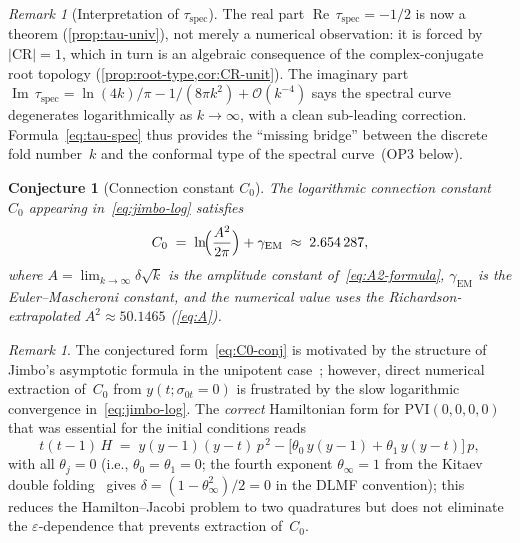 \documentclass[11pt,a4paper]{article}
\theoremstyle{plain}
\newtheorem{conjecture}[theorem]{Conjecture}
\theoremstyle{definition}
\theoremstyle{remark}
\newtheorem{remark}[theorem]{Remark}
\DeclareMathOperator{\Real}{Re}
\DeclareMathOperator{\Imag}{Im}
\newcommand{\Oo}{\mathcal{O}}
\begin{document}
\begin{remark}[Interpretation of $\tau_{\mathrm{spec}}$]
\label{rem:tau-spec-meaning}
The real part $\Real\,\tau_{\mathrm{spec}} = -1/2$ is now a
theorem (\cref{prop:tau-univ}), not merely a numerical
observation: it is forced by $\lvert\mathrm{CR}\rvert = 1$,
which in turn is an algebraic consequence of the
complex-conjugate root topology
(\cref{prop:root-type,cor:CR-unit}).
The imaginary part
$\Imag\,\tau_{\mathrm{spec}} = \ln(4k)/\pi - 1/(8\pi k^2)
+ \Oo(k^{-4})$
says the spectral curve degenerates logarithmically as
$k \to \infty$, with a clean sub-leading correction.
Formula~\eqref{eq:tau-spec} thus provides the
``missing bridge'' between the discrete fold number~$k$ and the
conformal type of the spectral curve~(OP3 below).
\end{remark}

\begin{conjecture}[Connection constant $C_0$]
\label{conj:C0}
The logarithmic connection constant~$C_0$ appearing
in~\eqref{eq:jimbo-log} satisfies
\begin{equation}\label{eq:C0-conj}
  C_0 \;=\; \ln\!\Bigl(\frac{A^2}{2\pi}\Bigr) + \gamma_{\mathrm{EM}}
  \;\approx\; 2.654\,287,
\end{equation}
where $A = \lim_{k\to\infty}\delta\sqrt{k}$ is the amplitude
constant of~\cref{eq:A2-formula},
$\gamma_{\mathrm{EM}}$ is the Euler--Mascheroni constant,
and the numerical value uses the Richardson-extrapolated
$A^2 \approx 50.1465$ (\cref{eq:A}).
\end{conjecture}

\begin{remark}
The conjectured form~\eqref{eq:C0-conj} is motivated by the
structure of Jimbo's asymptotic formula in the unipotent
case~\cite{Jim82}; however, direct numerical extraction of~$C_0$
from $y(t;\sigma_{0t}=0)$ is frustrated by the slow logarithmic
convergence in~\eqref{eq:jimbo-log}.
The \emph{correct} Hamiltonian form for $\mathrm{PVI}(0,0,0,0)$
that was essential for the initial conditions reads
\[
  t(t-1)\,H \;=\; y(y-1)(y-t)\,p^{\,2}
  - \bigl[\theta_0\,y(y-1) + \theta_1\,y(y-t)\bigr]\,p,
\]
with all $\theta_j = 0$ (i.e.,
$\theta_0 = \theta_1 = 0$; the fourth exponent
$\theta_\infty = 1$ from the Kitaev double
folding~\cite{DC26} gives
$\delta = (1 - \theta_\infty^2)/2 = 0$
in the DLMF convention); this reduces the Hamilton--Jacobi
problem to two quadratures but does not eliminate the
$\varepsilon$-dependence that prevents extraction of~$C_0$.
\end{remark}
\end{document}
